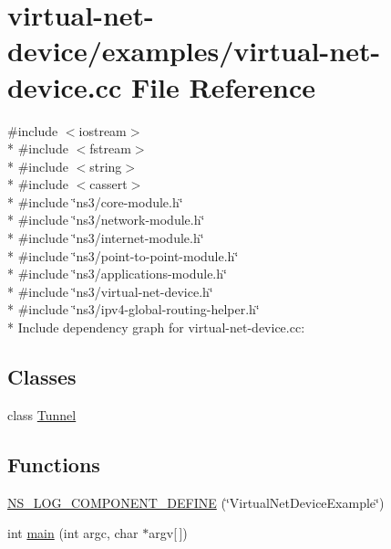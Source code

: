 \hypertarget{examples_2virtual-net-device_8cc}{}\section{virtual-\/net-\/device/examples/virtual-\/net-\/device.cc File Reference}
\label{examples_2virtual-net-device_8cc}
{\ttfamily \#include $<$iostream$>$}\\*
{\ttfamily \#include $<$fstream$>$}\\*
{\ttfamily \#include $<$string$>$}\\*
{\ttfamily \#include $<$cassert$>$}\\*
{\ttfamily \#include \char`\"{}ns3/core-\/module.\+h\char`\"{}}\\*
{\ttfamily \#include \char`\"{}ns3/network-\/module.\+h\char`\"{}}\\*
{\ttfamily \#include \char`\"{}ns3/internet-\/module.\+h\char`\"{}}\\*
{\ttfamily \#include \char`\"{}ns3/point-\/to-\/point-\/module.\+h\char`\"{}}\\*
{\ttfamily \#include \char`\"{}ns3/applications-\/module.\+h\char`\"{}}\\*
{\ttfamily \#include \char`\"{}ns3/virtual-\/net-\/device.\+h\char`\"{}}\\*
{\ttfamily \#include \char`\"{}ns3/ipv4-\/global-\/routing-\/helper.\+h\char`\"{}}\\*
Include dependency graph for virtual-\/net-\/device.cc\+:
\subsection*{Classes}
\begin{DoxyCompactItemize}
\item 
class \hyperlink{classTunnel}{Tunnel}
\end{DoxyCompactItemize}
\subsection*{Functions}
\begin{DoxyCompactItemize}
\item 
\hyperlink{examples_2virtual-net-device_8cc_a0972f310f8dc7619d5c0fe618a2908e6}{N\+S\+\_\+\+L\+O\+G\+\_\+\+C\+O\+M\+P\+O\+N\+E\+N\+T\+\_\+\+D\+E\+F\+I\+NE} (\char`\"{}Virtual\+Net\+Device\+Example\char`\"{})
\item 
int \hyperlink{examples_2virtual-net-device_8cc_a0ddf1224851353fc92bfbff6f499fa97}{main} (int argc, char $\ast$argv\mbox{[}$\,$\mbox{]})
\end{DoxyCompactItemize}


